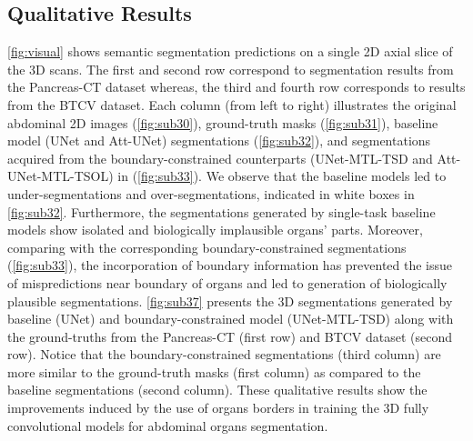 \documentclass[final,5p,times,twocolumn]{elsarticle}
\begin{document}
\subsection{Qualitative Results}
\autoref{fig:visual} shows semantic segmentation predictions on a single 2D axial slice of the 3D scans. The first and second row correspond to segmentation results from the Pancreas-CT dataset whereas, the third and fourth row corresponds to results from the BTCV dataset. Each column (from left to right) illustrates the original abdominal 2D images (\autoref{fig:sub30}), ground-truth masks (\autoref{fig:sub31}), baseline model (UNet and Att-UNet) segmentations (\autoref{fig:sub32}), and segmentations acquired from the boundary-constrained counterparts (UNet-MTL-TSD and Att-UNet-MTL-TSOL) in (\autoref{fig:sub33}). We observe that the baseline models led to under-segmentations and over-segmentations, indicated in white boxes in \autoref{fig:sub32}. Furthermore, the segmentations generated by single-task baseline models show isolated and biologically implausible organs' parts. Moreover, comparing with the corresponding boundary-constrained segmentations (\autoref{fig:sub33}), the incorporation of boundary information has prevented the issue of mispredictions near boundary of organs and led to generation of biologically plausible segmentations. \autoref{fig:sub37} presents the 3D segmentations generated by baseline (UNet) and boundary-constrained model (UNet-MTL-TSD) along with the ground-truths from the Pancreas-CT (first row) and BTCV dataset (second row). Notice that the boundary-constrained segmentations (third column) are more similar to the ground-truth masks (first column) as compared to the baseline segmentations (second column). These qualitative results show the improvements induced by the use of organs borders in training the 3D fully convolutional models for abdominal organs segmentation.
\end{document}
